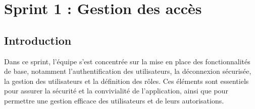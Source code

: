 
\chapter{  Sprint 1 : Gestion des accès}

\section*{Introduction}
Dans ce sprint, l'équipe s'est concentrée sur la mise en place des fonctionnalités de base, notamment l'authentification des utilisateurs, la déconnexion sécurisée, la gestion des utilisateurs et la définition des rôles. Ces éléments sont essentiels pour assurer la sécurité et la convivialité de l'application, ainsi que pour permettre une gestion efficace des utilisateurs et de leurs autorisations.


